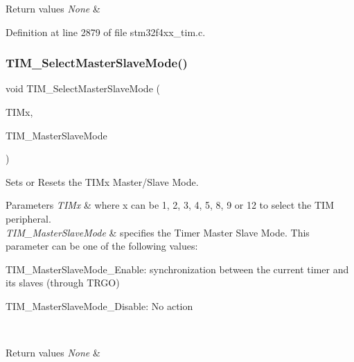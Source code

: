 \begin{DoxyRetVals}{Return values}
{\em None} & \\
\hline
\end{DoxyRetVals}


Definition at line 2879 of file stm32f4xx\+\_\+tim.\+c.

\mbox{\label{group___t_i_m___group7_ga4dcc3d11b670c381d0ff9cb7e9fd01e2}} 
\subsubsection{\texorpdfstring{T\+I\+M\+\_\+\+Select\+Master\+Slave\+Mode()}{TIM\_SelectMasterSlaveMode()}}
{\footnotesize\ttfamily void T\+I\+M\+\_\+\+Select\+Master\+Slave\+Mode (\begin{DoxyParamCaption}\item[{\hyperlink{struct_t_i_m___type_def}{T\+I\+M\+\_\+\+Type\+Def} $\ast$}]{T\+I\+Mx,  }\item[{uint16\+\_\+t}]{T\+I\+M\+\_\+\+Master\+Slave\+Mode }\end{DoxyParamCaption})}



Sets or Resets the T\+I\+Mx Master/\+Slave Mode. 


\begin{DoxyParams}{Parameters}
{\em T\+I\+Mx} & where x can be 1, 2, 3, 4, 5, 8, 9 or 12 to select the T\+IM peripheral. \\
\hline
{\em T\+I\+M\+\_\+\+Master\+Slave\+Mode} & specifies the Timer Master Slave Mode. This parameter can be one of the following values\+: \begin{DoxyItemize}
\item T\+I\+M\+\_\+\+Master\+Slave\+Mode\+\_\+\+Enable\+: synchronization between the current timer and its slaves (through T\+R\+GO) \item T\+I\+M\+\_\+\+Master\+Slave\+Mode\+\_\+\+Disable\+: No action \end{DoxyItemize}
\\
\hline
\end{DoxyParams}

\begin{DoxyRetVals}{Return values}
{\em None} & \\
\hline
\end{DoxyRetVals}


